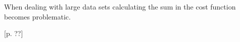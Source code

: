 When dealing with large data sets calculating the sum in the cost function becomes problematic.
 



\begin{flushright}
\cite{Bishop2006}[p. ??]
\end{flushright}

%
%
%
%
%
%
%
%
%
